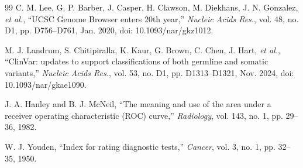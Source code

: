 \documentclass[10pt,journal,a4paper]{IEEEtran}
\begin{document}
\begin{thebibliography}{99}
 C. M. Lee, G. P. Barber, J. Casper, H. Clawson, M. Diekhans, J. N. Gonzalez, \emph{et al.}, ``UCSC Genome Browser enters 20th year,'' \textit{Nucleic Acids Res.}, vol. 48, no. D1, pp. D756--D761, Jan. 2020, doi: 10.1093/nar/gkz1012.

 M. J. Landrum, S. Chitipiralla, K. Kaur, G. Brown, C. Chen, J. Hart, \emph{et al.}, ``ClinVar: updates to support classifications of both germline and somatic variants,'' \textit{Nucleic Acids Res.}, vol. 53, no. D1, pp. D1313--D1321, Nov. 2024, doi: 10.1093/nar/gkae1090.

 J. A. Hanley and B. J. McNeil, ``The meaning and use of the area under a receiver operating characteristic (ROC) curve,'' \textit{Radiology}, vol. 143, no. 1, pp. 29--36, 1982.

 W. J. Youden, ``Index for rating diagnostic tests,'' \textit{Cancer}, vol. 3, no. 1, pp. 32--35, 1950.

\end{thebibliography}
\end{document}
